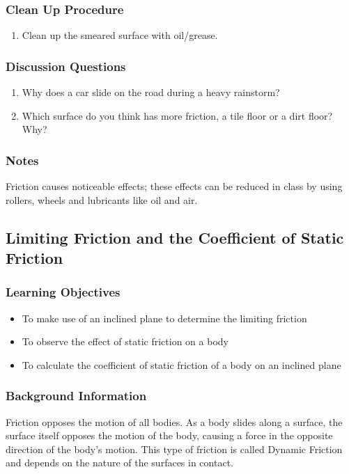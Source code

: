 \subsubsection*{Clean Up Procedure}
\begin{enumerate}
\item{Clean up the smeared surface with oil/grease.} 
\end{enumerate}

\subsubsection*{Discussion Questions}
\begin{enumerate}
\item{Why does a car slide on the road during a heavy rainstorm?}
\item{Which surface do you think has more friction, a tile floor or a dirt floor? Why?}
\end{enumerate}

\subsubsection*{Notes}
Friction causes noticeable effects; these effects can be reduced in class by using rollers, wheels and lubricants like oil and air.

\subsection{Limiting Friction and the Coefficient of Static Friction}

\subsubsection*{Learning Objectives}
\begin{itemize}
\item{To make use of an inclined plane to determine the limiting friction} 
\item{To observe the effect of static friction on a body} 
\item{To calculate the coefficient of static friction of a body on an inclined plane} 
\end{itemize}

\subsubsection*{Background Information}
Friction opposes the motion of all bodies. As a body slides along a surface, the surface itself opposes the motion of the body, causing a force in the opposite direction of the body's motion. This type of friction is called Dynamic Friction and depends on the nature of the surfaces in contact.  

